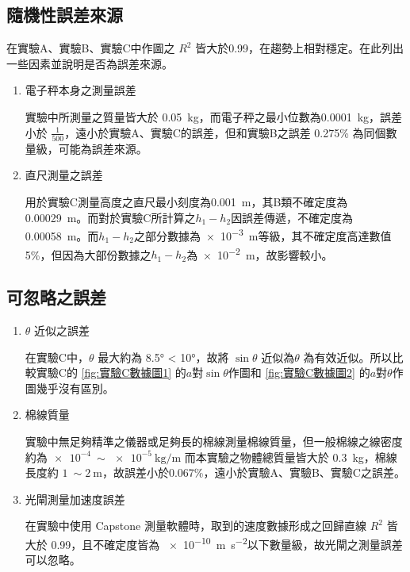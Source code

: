 \documentclass[11pt,a4paper]{article}
\theoremstyle{definition}
\begin{document}
        \subsection{隨機性誤差來源}

            在實驗A、實驗B、實驗C中作圖之 $R^2$ 皆大於0.99，在趨勢上相對穩定。在此列出一些因素並說明是否為誤差來源。
            \begin{enumerate}

                \item 電子秤本身之測量誤差
                \par
                實驗中所測量之質量皆大於 \SI{0.05}{\kilogram}，而電子秤之最小位數為\SI{0.0001}{\kilogram}，誤差小於 $\displaystyle\frac{1}{500}$，遠小於實驗A、實驗C的誤差，但和實驗B之誤差 0.275\% 為同個數量級，可能為誤差來源。
                \item 直尺測量之誤差
                \par
                用於實驗C測量高度之直尺最小刻度為\SI{0.001}{\meter}，其B類不確定度為\SI{0.00029}{\meter}。而對於實驗C所計算之$h_1 - h_2$因誤差傳遞，不確定度為\SI{0.00058}{\meter}。而$h_1 - h_2$之部分數據為\SI{e-3}{\meter}等級，其不確定度高達數值5\%，但因為大部份數據之$h_1 - h_2$為\SI{e-2}{\meter}，故影響較小。
            \end{enumerate}

        \subsection{可忽略之誤差}

            \begin{enumerate}

                \item $\theta$ 近似之誤差
                \par
                在實驗C中，$\theta$ 最大約為 \ang{8.5} < \ang{10}，故將 $\sin{\theta}$ 近似為$\theta$ 為有效近似。所以比較實驗C的 \autoref{fig:實驗C數據圖1} 的$a$對$\sin\theta$作圖和 \autoref{fig:實驗C數據圖2} 的$a$對$\theta$作圖幾乎沒有區別。

                \item 棉線質量
                \par
                實驗中無足夠精準之儀器或足夠長的棉線測量棉線質量，但一般棉線之線密度約為$\SI{e-4}{} \sim \SI{e-5}{\kilogram\per\meter}$ 而本實驗之物體總質量皆大於 \SI{0.3}{\kilogram}，棉線長度約 $\SI{1}{} \sim \SI{2}{\meter}$，故誤差小於0.067\%，遠小於實驗A、實驗B、實驗C之誤差。

                \item 光閘測量加速度誤差
                \par
                在實驗中使用 Capstone 測量軟體時，取到的速度數據形成之回歸直線 $R^2$ 皆大於 0.99，且不確定度皆為 \SI{e-10}{\meter\per\second\squared}以下數量級，故光閘之測量誤差可以忽略。

            \end{enumerate}
\end{document}

